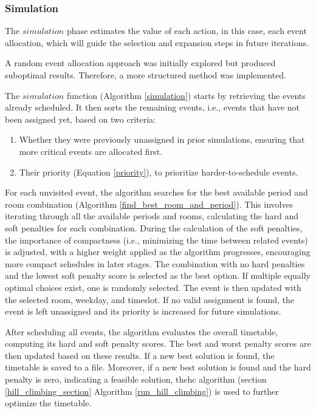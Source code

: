 \subsubsection{Simulation}

The \(simulation\) phase estimates the value of each action, in this case, each event allocation, which will guide the selection and expansion steps in future iterations. 

A random event allocation approach was initially explored but produced suboptimal results. Therefore, a more structured method was implemented.

The \(simulation\) function (Algorithm \ref{simulation}) starts by retrieving the events already scheduled. It then sorts the remaining events, i.e., events that have not been assigned yet, based on two criteria:
\begin{enumerate}
\item Whether they were previously unassigned in prior simulations, ensuring that more critical events are allocated first.
\item Their priority (Equation \ref{priority}), to prioritize harder-to-schedule events.
\end{enumerate}

For each unvisited event, the algorithm searches for the best available period and room combination (Algorithm \ref{find_best_room_and_period}). This involves iterating through all the available periods and rooms, calculating the hard and soft penalties for each combination. During the calculation of the soft penalties, the importance of compactness (i.e., minimizing the time between related events) is adjusted, with a higher weight applied as the algorithm progresses, encouraging more compact schedules in later stages. The combination with no hard penalties and the lowest soft penalty score is selected as the best option. If multiple equally optimal choices exist, one is randomly selected. The event is then updated with the selected room, weekday, and timeslot. If no valid assignment is found, the event is left unassigned and its priority is increased for future simulations.

After scheduling all events, the algorithm evaluates the overall timetable, computing its hard and soft penalty scores. The best and worst penalty scores are then updated based on these results. If a new best solution is found, the timetable is saved to a file. Moreover, if a new best solution is found and the hard penalty is zero, indicating a feasible solution, the\ac{hc} algorithm (section \ref{hill_climbing_section} Algorithm \ref{run_hill_climbing}) is used to further optimize the timetable.

